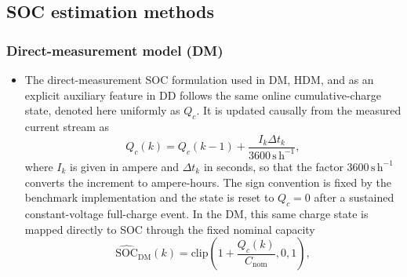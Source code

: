 \documentclass[review,nopreprintline]{elsarticle}
\begin{document}
\subsection{SOC estimation methods}
\subsubsection{Direct-measurement model (DM)}
\begin{itemize}[leftmargin=*]
    \item The direct-measurement SOC formulation used in DM, HDM, and as an explicit auxiliary feature in DD follows the same online cumulative-charge state, denoted here uniformly as $Q_c$. It is updated causally from the measured current stream as
    \begin{equation}
        Q_c(k)=Q_c(k-1)+\frac{I_k \Delta t_k}{3600\,\mathrm{s\,h^{-1}}},
        \label{eq:qc_update}
    \end{equation}
    where $I_k$ is given in ampere and $\Delta t_k$ in seconds, so that the factor $3600\,\mathrm{s\,h^{-1}}$ converts the increment to ampere-hours. The sign convention is fixed by the benchmark implementation and the state is reset to $Q_c=0$ after a sustained constant-voltage full-charge event. In the DM, this same charge state is mapped directly to SOC through the fixed nominal capacity
    \begin{equation}
        \widehat{\mathrm{SOC}}_{\mathrm{DM}}(k)=\mathrm{clip}\!\left(1+\frac{Q_c(k)}{C_{\mathrm{nom}}},0,1\right),
        \label{eq:soc_dm}
    \end{equation}
\end{itemize}
\end{document}
